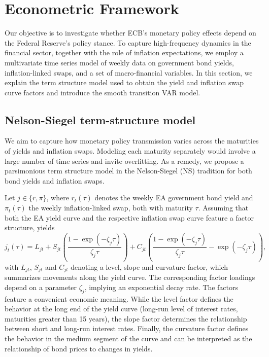 \section{Econometric Framework}\label{sec:framework}

Our objective is to investigate whether ECB's monetary policy effects depend on the Federal Reserve's policy stance. To capture high-frequency dynamics in the financial sector, together with the role of inflation expectations, we employ a multivariate time series model of weekly data on government bond yields, inflation-linked swaps, and a set of macro-financial variables.
In this section, we explain the term structure model used to obtain the yield and inflation swap curve factors and introduce the smooth transition VAR model.

\subsection{Nelson-Siegel term-structure model}

We aim to capture how monetary policy transmission varies across the maturities of yields and inflation swaps. Modeling each maturity separately would involve a large number of time series and invite overfitting. As a remedy, we propose a parsimonious term structure model in the Nelson-Siegel (NS) tradition \citep{nelson1987parsimonious, DIEBOLD2006337, boraugan2020term} for both bond yields and inflation swaps. 

Let $j\in \{r,\pi\}$, where $r_{t}(\tau)$ denotes the weekly EA government bond yield and $\pi_{t}(\tau)$ the weekly inflation-linked swap, both with maturity $\tau$. Assuming that both the EA yield curve and the respective inflation swap curve feature a factor structure, yields
\begin{equation}\label{eq:NSfactors}
j_{t}(\tau) = L_{j t} + S_{j t}  \left( \frac{1-\exp \left(-\zeta_{j} \tau \right)}{\zeta_{j} \tau}\right) + C_{jt} \left( \frac{1-\exp \left( -\zeta_{j} \tau \right)}{\zeta_{j} \tau} - \exp \left(-\zeta_{j} \tau \right) \right), 
\end{equation}
with $L_{jt}$, $S_{jt}$ and $C_{jt}$ denoting a level, slope and curvature factor, which summarizes movements along the  yield curve. The corresponding factor loadings depend on a parameter $\zeta_j$, implying an exponential decay rate. The factors feature a convenient economic meaning. While the level factor  defines the behavior at the long end of the yield curve (long-run level of interest rates, maturities greater than 15 years), the slope factor determines the relationship between short and long-run interest rates. Finally, the curvature factor defines the behavior in the medium segment of the curve and can be interpreted as the relationship of bond prices to changes in yields. 

